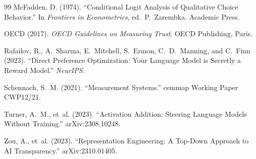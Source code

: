 \documentclass[11pt,letterpaper]{article}
\begin{document}
\begin{thebibliography}{99}
McFadden, D. (1974).
``Conditional Logit Analysis of Qualitative Choice Behavior.''
In \textit{Frontiers in Econometrics}, ed.~P.~Zarembka. Academic Press.

OECD (2017). \textit{OECD Guidelines on Measuring Trust}. OECD Publishing, Paris.

Rafailov, R., A.~Sharma, E.~Mitchell, S.~Ermon, C.~D.~Manning, and C.~Finn (2023).
``Direct Preference Optimization: Your Language Model is Secretly a Reward Model.'' \textit{NeurIPS}.

Schennach, S.~M. (2021). ``Measurement Systems.'' cemmap Working Paper CWP12/21.

Turner, A.~M., et~al. (2023).
``Activation Addition: Steering Language Models Without Training.'' arXiv:2308.10248.

Zou, A., et~al. (2023).
``Representation Engineering: A Top-Down Approach to AI Transparency.'' arXiv:2310.01405.

\end{thebibliography}
\end{document}
